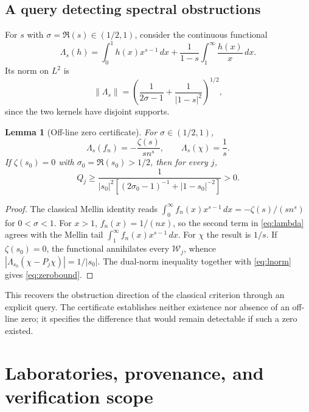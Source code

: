 \documentclass[11pt,a4paper]{article}
\theoremstyle{mine}
\newtheorem{lemma}[theorem]{Lemma}
\theoremstyle{definition}
\newcommand{\WW}{\mathcal W}
\newcommand{\norm}[1]{\left\lVert#1\right\rVert}
\begin{document}
\subsection{A query detecting spectral obstructions}

For $s$ with $\sigma=\Re(s)\in(1/2,1)$, consider the continuous functional
\begin{equation}\label{eq:lambda}
\Lambda_s(h)=\int_0^1h(x)x^{s-1}\,dx
+\frac{1}{1-s}\int_1^\infty\frac{h(x)}{x}\,dx.
\end{equation}
Its norm on $L^2$ is
\begin{equation}\label{eq:lnorm}
\norm{\Lambda_s}=\left(\frac1{2\sigma-1}+\frac1{|1-s|^2}\right)^{1/2},
\end{equation}
since the two kernels have disjoint supports.

\begin{lemma}[Off-line zero certificate]\label{le:zeros}
For $\sigma\in(1/2,1)$,
\begin{equation}\label{eq:melldetect}
\Lambda_s(f_n)=-\frac{\zeta(s)}{s n^s},\qquad\Lambda_s(\chi)=\frac1s.
\end{equation}
If $\zeta(s_0)=0$ with $\sigma_0=\Re(s_0)>1/2$, then for every $j$,
\begin{equation}\label{eq:zerobound}
\boxed{\quad Q_j\ge \frac{1}{|s_0|^2\left[(2\sigma_0-1)^{-1}+|1-s_0|^{-2}\right]}>0.\quad}
\end{equation}
\end{lemma}
\begin{proof}
The classical Mellin identity reads
$\int_0^\infty f_n(x)x^{s-1}\,dx=-\zeta(s)/(sn^s)$ for $0<\sigma<1$. For $x>1$, $f_n(x)=1/(nx)$, so the second term in \eqref{eq:lambda} agrees with the Mellin tail $\int_1^\infty f_n(x)x^{s-1}\,dx$. For $\chi$ the result is $1/s$. If $\zeta(s_0)=0$, the functional annihilates every $\WW_j$, whence $|\Lambda_{s_0}(\chi-P_j\chi)|=1/|s_0|$. The dual-norm inequality together with \eqref{eq:lnorm} gives \eqref{eq:zerobound}.
\end{proof}

This recovers the obstruction direction of the classical criterion through an explicit query. The certificate establishes neither existence nor absence of an off-line zero; it specifies the difference that would remain detectable if such a zero existed.

\section{Laboratories, provenance, and verification scope}
\end{document}
